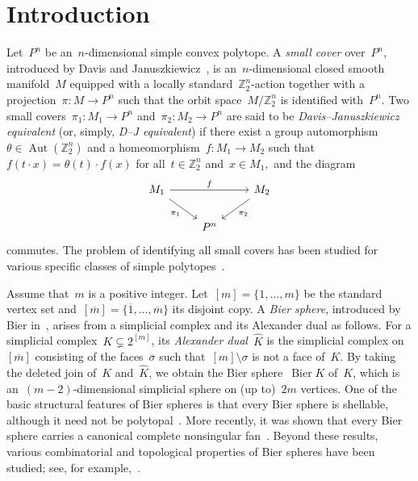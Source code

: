 \documentclass[11pt]{amsart}
\theoremstyle{plain}
\numberwithin{equation}{section}
\theoremstyle{definition}
\newcommand{\Z}{\mathbb{Z}}
\DeclareMathOperator{\Bier}{Bier}
\DeclareMathOperator{\Aut}{Aut}
\begin{document}
\section{Introduction} \label{sec:intro}
Let~$P^n$ be an~$n$-dimensional simple convex polytope.
A \emph{small cover} over~$P^n$, introduced by Davis and Januszkiewicz~\cite{Davis-Januszkiewicz1991}, is an~$n$-dimensional closed smooth manifold~$M$ equipped with a locally standard~$\Z_2^n$-action together with a projection~$\pi\colon M \to P^n$ such that the orbit space~$M/\Z_2^n$ is identified with~$P^n$.
Two small covers~$\pi_1 \colon M_1 \to P^n$ and~$\pi_2 \colon M_2 \to P^n$ are said to be \emph{Davis--Januszkiewicz equivalent} (or, simply, \emph{D--J equivalent}) if there exist a group automorphism~$\theta\in \Aut(\Z_2^n)$ and a homeomorphism~$f \colon M_1 \to M_2$ such that~$f(t\cdot x)=\theta(t)\cdot f(x)$ for all~$t\in \Z_2^n$ and~$x\in M_1,$ and the diagram
$$
    \begin{tikzcd}
        M_1 \arrow[rr,"f"] \arrow[dr,"\pi_1"'] & & M_2 \arrow[dl,"\pi_2"] \\
        & P^n &
    \end{tikzcd}
$$
commutes.
The problem of identifying all small covers has been studied for various specific classes of simple polytopes~\cite{Garrison-Scott2003, Cai-Chen-Lu2007, Choi2008, Choi-Masuda-Suh2010Quasitoric, Choi2010, Wang-Chen2012, Hasui2015, Choi-Park2019SmallCovers}.

Assume that~$m$ is a positive integer. 
Let~$[m] = \{1, \ldots, m\}$ be the standard vertex set and~$[\overline{m}] = \{\overline{1}, \ldots, \overline{m}\}$ its disjoint copy.
A \emph{Bier sphere}, introduced by Bier in~\cite{Bier1992}, arises from a simplicial complex and its Alexander dual as follows.
For a simplicial complex~$K\subsetneq 2^{[m]}$, its \emph{Alexander dual}~$\widehat{K}$ is the simplicial complex on~$[\overline{m}]$ consisting of the faces~$\overline{\sigma}$ such that~$[m]\setminus\sigma$ is not a face of~$K$.
By taking the deleted join of~$K$ and~$\widehat{K}$, we obtain the Bier sphere~$\Bier K$ of~$K$, which is an~$(m-2)$-dimensional simplicial sphere on (up to)~$2m$ vertices.
One of the basic structural features of Bier spheres is that every Bier sphere is shellable, although it need not be polytopal~\cite{Bjorner-Paffenholz-Sjostrand-Ziegler2005}.
More recently, it was shown that every Bier sphere carries a canonical complete nonsingular fan~\cite{Ivan-Marinko-Rade2025}.
Beyond these results, various combinatorial and topological properties of Bier spheres have been studied; see, for example,~\cite{Murai2011,Heudtlass-Katthan2012,Jevtic-Timotijevic-Zivaljevic2021,Limonchenko-Sergeev2024,Limonchenko-Vavpeti2024,Choi-Yoon-Yu2026}.
\end{document}
